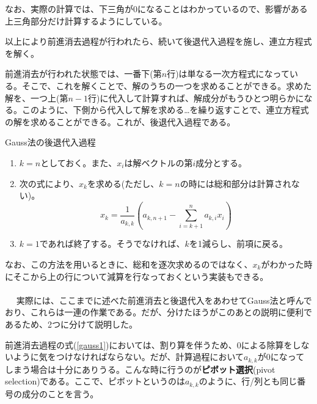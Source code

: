 なお、実際の計算では、下三角が0になることはわかっているので、影響がある上三角部分だけ計算するようにしている。

以上により前進消去過程が行われたら、続いて後退代入過程を施し、連立方程式を解く。

前進消去が行われた状態では、一番下(第$n$行)は単なる一次方程式になっている。そこで、これを解くことで、解のうちの一つを求めることができる。求めた解を、一つ上(第$n-1$行)に代入して計算すれば、解成分がもうひとつ明らかになる。このように、下側から代入して解を求める…を繰り返すことで、連立方程式の解を求めることができる。これが、後退代入過程である。
\begin{itembox}[l]{Gauss法の後退代入過程}
\begin{enumerate}
\item $k=n$としておく。また、$x_i$は解ベクトルの第$i$成分とする。
\item 次の式により、$x_k$を求める(ただし、$k=n$の時には総和部分は計算されない)。
\begin{equation}
x_k=\frac{1}{a_{k,k}}\left(a_{k,n+1}-\sum^{n}_{i=k+1}a_{k,i}x_{i}\right) \label{gauss2}
\end{equation}
\item $k=1$であれば終了する。そうでなければ、$k$を1減らし、前項に戻る。
\end{enumerate}
\end{itembox}

なお、この方法を用いるときに、総和を逐次求めるのではなく、$x_k$がわかった時にそこから上の行について減算を行なっておくという実装もできる。
\\ \\　
実際には、ここまでに述べた前進消去と後退代入をあわせてGauss法と呼んでおり、これらは一連の作業である。だが、分けたほうがこのあとの説明に便利であるため、2つに分けて説明した。

前進消去過程の式(\ref{gauss1})においては、割り算を伴うため、0による除算をしないように気をつけなければならない。だが、計算過程において$a_{k,k}$が0になってしまう場合は十分にありうる。こんな時に行うのが\textbf{ピボット選択}(pivot selection)である。ここで、ピボットというのは$a_{k,k}$のように、行/列とも同じ番号の成分のことを言う。

